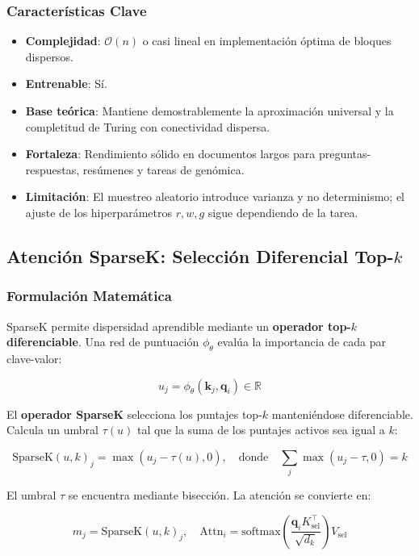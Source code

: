 \documentclass[11pt,a4paper]{article}
\begin{document}
\subsubsection{Características Clave}

\begin{itemize}[leftmargin=*]
    \item \textbf{Complejidad}: $\mathcal{O}(n)$ o casi lineal en implementación óptima de bloques dispersos.
    \item \textbf{Entrenable}: Sí.
    \item \textbf{Base teórica}: Mantiene demostrablemente la aproximación universal y la completitud de Turing con conectividad dispersa.
    \item \textbf{Fortaleza}: Rendimiento sólido en documentos largos para preguntas-respuestas, resúmenes y tareas de genómica.
    \item \textbf{Limitación}: El muestreo aleatorio introduce varianza y no determinismo; el ajuste de los hiperparámetros $r, w, g$ sigue dependiendo de la tarea.
\end{itemize}

\subsection{Atención SparseK: Selección Diferencial Top-$k$}

\subsubsection{Formulación Matemática}

SparseK \citep{lou_sparsek_2024} permite dispersidad aprendible mediante un \textbf{operador top-$k$ diferenciable}. Una red de puntuación $\phi_\theta$ evalúa la importancia de cada par clave-valor:

\[
u_j = \phi_\theta(\mathbf{k}_j, \mathbf{q}_i) \in \mathbb{R}
\]

El \textbf{operador SparseK} selecciona los puntajes top-$k$ manteniéndose diferenciable. Calcula un umbral $\tau(u)$ tal que la suma de los puntajes activos sea igual a $k$:

\[
\text{SparseK}(u, k)_j = \max(u_j - \tau(u), 0), \quad \text{donde} \quad \sum_j \max(u_j - \tau, 0) = k
\]

El umbral $\tau$ se encuentra mediante bisección. La atención se convierte en:

\[
m_j = \text{SparseK}(u, k)_j, \quad \text{Attn}_i = \text{softmax}\left(\frac{\mathbf{q}_i K_{\text{sel}}^\top}{\sqrt{d_k}}\right) V_{\text{sel}}
\]
\end{document}
